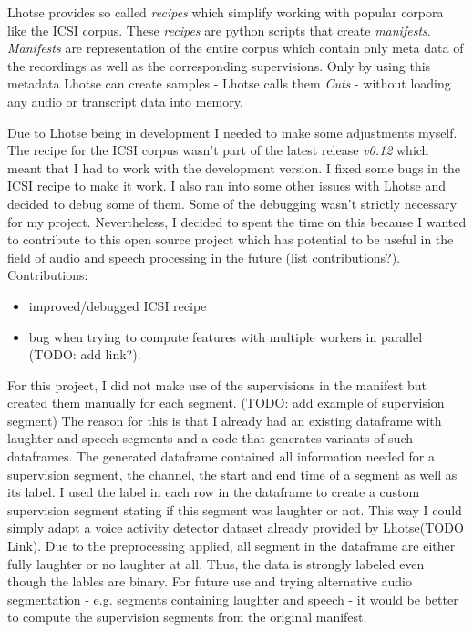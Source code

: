 \documentclass[bsc,frontabs,parskip,deptreport]{infthesis}
\begin{document}
Lhotse provides so called \textit{recipes} which simplify working with popular corpora like the ICSI corpus.
These \textit{recipes} are python scripts that create \textit{manifests}.
\textit{Manifests} are representation of the entire corpus which contain only meta data of the recordings as well as the corresponding supervisions. 
Only by using this metadata Lhotse can create samples - Lhotse calls them \textit{Cuts} - without loading any audio or transcript data into memory. 

Due to Lhotse being in development I needed to make some adjustments myself. The recipe for the ICSI corpus wasn't part of the latest release \textit{v0.12} which meant that I had to work with the development version. I fixed some bugs in the ICSI recipe to make it work. I also ran into some other issues with Lhotse and decided to debug some of them. Some of the debugging wasn't strictly necessary for my project. Nevertheless, I decided to spent the time on this because I wanted to contribute to this open source project which has potential to be useful in the field of audio and speech processing in the future (list contributions?).
Contributions: 
\begin{itemize}
    \item improved/debugged ICSI recipe 
    \item bug when trying to compute features with multiple workers in parallel (TODO: add link?).
\end{itemize}

For this project, I did not make use of the supervisions in the manifest but created them manually for each segment. (TODO: add example of supervision segment)
The reason for this is that I already had an existing dataframe with laughter and speech segments and a code that generates variants of such dataframes.
The generated dataframe contained all information needed for a supervision segment, the channel, the start and end time of a segment as well as its label. 
I used the label in each row in the dataframe to create a custom supervision segment stating if this segment was laughter or not. 
This way I could simply adapt a voice activity detector dataset already provided by Lhotse(TODO Link). Due to the preprocessing applied, all segment in the dataframe are either fully laughter or no laughter at all.
Thus, the data is strongly labeled even though the lables are binary.
For future use and trying alternative audio segmentation - e.g. segments containing laughter and speech - it would be better to compute the supervision segments from the original manifest.  
\end{document}
